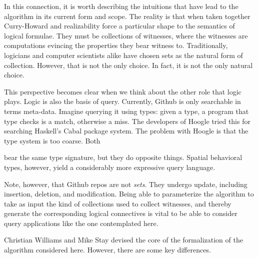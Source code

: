 In this connection, it is worth describing the intuitions that have
lead to the algorithm in its current form and scope. The reality is
that when taken together Curry-Howard and realizability force a
particular shape to the semantics of logical formulae. They must be
collections of witnesses, where the witnesses are computations
evincing the properties they bear witness to. Traditionally, logicians
and computer scientists alike have chosen sets as the natural form of
collection. However, that is not the only choice. In fact, it is not
the only natural choice.

This perspective becomes clear when we think about the other role that
logic plays. Logic is also the basis of query. Currently, Github is
only searchable in terms meta-data. Imagine querying it using types:
given a type, a program that type checks is a match, otherwise a
miss. The developers of Hoogle \cite{mitchell_2011} tried this for
searching Haskell's Cabal package system. The problem with Hoogle is
that the type system is too coarse. Both

bear the same type signature, but they do opposite things. Spatial
behavioral types, however, yield a considerably more expressive query
language.

Note, however, that Github repos are not \emph{sets}. They undergo
update, including insertion, deletion, and modification. Being able to
parameterize the algorithm to take as input the kind of collections
used to collect witnesses, and thereby generate the corresponding
logical connectives is vital to be able to consider query applications
like the one contemplated here.

Christian Williams and Mike Stay devised the core of the formalization
of the algorithm considered here. However, there are some key
differences.


